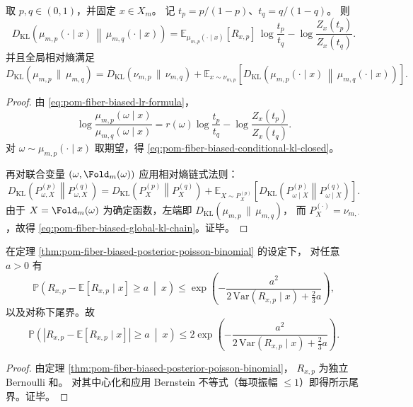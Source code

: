 \begin{theorem}\label{thm:pom-fiber-biased-conditional-kl-chain}
取 \(p,q\in(0,1)\)，并固定 \(x\in X_m\)。
记 \(t_p=p/(1-p)\)、\(t_q=q/(1-q)\)。
则
\begin{equation}\label{eq:pom-fiber-biased-conditional-kl-closed}
D_{\mathrm{KL}}\!\left(\mu_{m,p}(\cdot\mid x)\,\middle\|\,\mu_{m,q}(\cdot\mid x)\right)
=
\mathbb E_{\mu_{m,p}(\cdot\mid x)}[R_{x,p}]\,\log\frac{t_p}{t_q}
-\log\frac{Z_x(t_p)}{Z_x(t_q)}.
\end{equation}
并且全局相对熵满足
\begin{equation}\label{eq:pom-fiber-biased-global-kl-chain}
D_{\mathrm{KL}}(\mu_{m,p}\,\|\,\mu_{m,q})
=
D_{\mathrm{KL}}(\nu_{m,p}\,\|\,\nu_{m,q})
+
\mathbb E_{x\sim \nu_{m,p}}
\!\left[
D_{\mathrm{KL}}\!\left(\mu_{m,p}(\cdot\mid x)\,\middle\|\,\mu_{m,q}(\cdot\mid x)\right)
\right].
\end{equation}
\end{theorem}
\begin{proof}
由 \eqref{eq:pom-fiber-biased-lr-formula}，
\[
\log\frac{\mu_{m,p}(\omega\mid x)}{\mu_{m,q}(\omega\mid x)}
=
r(\omega)\log\frac{t_p}{t_q}
-\log\frac{Z_x(t_p)}{Z_x(t_q)}.
\]
对 \(\omega\sim\mu_{m,p}(\cdot\mid x)\) 取期望，得
\eqref{eq:pom-fiber-biased-conditional-kl-closed}。

再对联合变量 \((\omega,\Fold_m(\omega))\) 应用相对熵链式法则：
\[
D_{\mathrm{KL}}\!\left(P_{\omega,X}^{(p)}\middle\|P_{\omega,X}^{(q)}\right)
=
D_{\mathrm{KL}}\!\left(P_X^{(p)}\middle\|P_X^{(q)}\right)
+
\mathbb E_{X\sim P_X^{(p)}}
\left[D_{\mathrm{KL}}\!\left(P_{\omega\mid X}^{(p)}\middle\|P_{\omega\mid X}^{(q)}\right)\right].
\]
由于 \(X=\Fold_m(\omega)\) 为确定函数，左端即
\(
D_{\mathrm{KL}}(\mu_{m,p}\,\|\,\mu_{m,q})
\)，
而 \(P_X^{(\cdot)}=\nu_{m,\cdot}\)，故得
\eqref{eq:pom-fiber-biased-global-kl-chain}。证毕。
\end{proof}



\begin{corollary}[偏置后验下逆代换次数的统一浓缩界]\label{cor:pom-fiber-biased-posterior-bernstein}
在定理 \ref{thm:pom-fiber-biased-posterior-poisson-binomial} 的设定下，
对任意 \(a>0\) 有
\[
\mathbb P\!\left(R_{x,p}-\mathbb E[R_{x,p}\mid x]\ge a\ \middle|\ x\right)
\le
\exp\!\left(
-\frac{a^2}{2\,\mathrm{Var}(R_{x,p}\mid x)+\frac{2}{3}a}
\right),
\]
以及对称下尾界。故
\[
\mathbb P\!\left(\left|R_{x,p}-\mathbb E[R_{x,p}\mid x]\right|\ge a\ \middle|\ x\right)
\le
2\exp\!\left(
-\frac{a^2}{2\,\mathrm{Var}(R_{x,p}\mid x)+\frac{2}{3}a}
\right).
\]
\end{corollary}
\begin{proof}
由定理 \ref{thm:pom-fiber-biased-posterior-poisson-binomial}，
\(
R_{x,p}
\)
为独立 Bernoulli 和。
对其中心化和应用 Bernstein 不等式（每项振幅 \(\le 1\)）即得所示尾界。证毕。
\end{proof}

